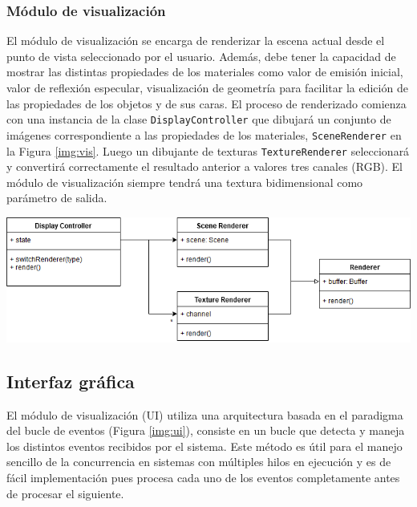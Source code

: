 \subsubsection{Módulo de visualización}

El módulo de visualización se encarga de renderizar la escena actual desde el punto de vista seleccionado por el usuario. Además, debe tener la capacidad de mostrar las distintas propiedades de los materiales como valor de emisión inicial, valor de reflexión especular, visualización de geometría para facilitar la edición de las propiedades de los objetos y de sus caras. El proceso de renderizado comienza con una instancia de la clase \verb|DisplayController| que dibujará un conjunto de imágenes correspondiente a las propiedades de los materiales, \verb|SceneRenderer| en la Figura \ref{img:vis}. Luego un dibujante de texturas \verb|TextureRenderer| seleccionará y convertirá correctamente el resultado anterior a valores tres canales (RGB). El módulo de visualización siempre tendrá una textura bidimensional como parámetro de salida.

\vspace{5mm}
\begin{minipage}[h]{0.8\linewidth}
	\centering
	\includegraphics[width=\linewidth]{assets/display}
	\label{img:vis}
\end{minipage}

\subsection{Interfaz gráfica}

El módulo de visualización (UI) utiliza una arquitectura basada en el paradigma del bucle de eventos (Figura \ref{img:ui}), consiste en un bucle que detecta y maneja los distintos eventos recibidos por el sistema. Este método es útil para el manejo sencillo de la concurrencia en sistemas con múltiples hilos en ejecución y es de fácil implementación pues procesa cada uno de los eventos completamente antes de procesar el siguiente.

